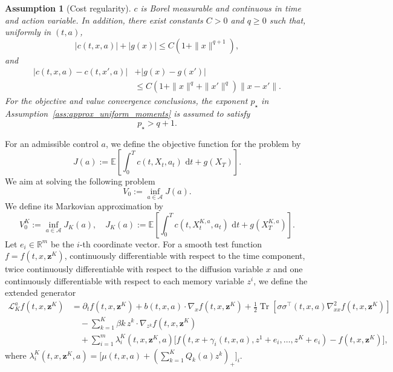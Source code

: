 \documentclass[11pt]{article}
\newtheorem{assumption}{Assumption}[section]
\theoremstyle{remarkitalic}
\theoremstyle{remarkitalic}
\newcommand{\R}{\mathbb R}
\newcommand{\E}{\mathbb E}
\newcommand{\dd}{\,\mathrm d}
\newcommand{\1}{\mathbf 1}
\newcommand{\Tr}{\operatorname{Tr}}
\begin{document}
\begin{assumption}[Cost regularity]
\label{ass:reward}
$c$ is Borel measurable and continuous in time and action variable. In addition, there exist constants $C>0$ and $q\ge0$ such that,  uniformly in
$(t,a)$,
\[
    |c(t,x,a)|+|g(x)|
    \le
    C(1+\|x\|^{q+1}),
\]
and
\[
\begin{aligned}
    |c(t,x,a)-c(t,x',a)|
    &+
    |g(x)-g(x')|  \\
    &\le
    C\left(1+\|x\|^q+\|x'\|^q\right)\|x-x'\|.
\end{aligned}
\] For the objective and value convergence conclusions, the exponent
$p_\star$ in
Assumption~\ref{ass:approx_uniform_moments} is assumed to satisfy
\[
p_\star>q+1.
\]
\end{assumption} For an admissible control $a$, we define the objective function for the problem by
\[
    J(a)
    :=
    \E\left[\int_0^T c(t,X_t,a_t)\,\dd t+g(X_T)\right].
\] We aim at solving the following problem
\[
    V_0:=\inf_{a\in \mathcal A} J(a).
\] We define its Markovian approximation by
\[
    V_0^K:=\inf_{a\in \mathcal A} J_K(a),\quad J_K(a)
    :=
    \E\left[\int_0^T c(t,X_t^{K,a},a_t)\,\dd t+g(X_T^{K,a})\right].
\] Let $e_i\in\R^m$ be the $i$-th coordinate vector. For a smooth test function $f=f(t,x,\mathbf z^K)$, continuously differentiable with respect to the time component, twice continuously differentiable with respect to the diffusion variable $x$ and  one continuously differentiable with respect to each memory variable $z^i$, we define the extended generator 
\begin{align*}
\label{eq:generator}
    \mathcal L_K^a f(t,x,\mathbf z^K)
    &=
    \partial_t f(t,x,\mathbf z^K)
    +
    b(t,x,a)\cdot \nabla_x f(t,x,\mathbf z^K)
    +
    \frac12\Tr\left[\sigma\sigma^\top(t,x,a)\nabla_{xx}^2 f(t,x,\mathbf z^K)\right]
    \nonumber\\
    &\quad
    -
    \sum_{k=1}^K \beta k\, z^k\cdot \nabla_{z^k}f(t,x,\mathbf z^K)
    \nonumber\\
    &\quad
    +
    \sum_{i=1}^m
    \lambda_i^K(t,x,\mathbf z^K,a)
    \Big[
        f(t,x+\gamma_i(t,x,a),z^1+e_i,\dots,z^K+e_i)
        -f(t,x,\mathbf z^K)
    \Big],
\end{align*} where $\lambda_i^K(t,x,\mathbf z^K,a)  =\Big[\mu(t,x,a)
    +
    \left(\sum_{k=1}^K Q_k(a)z^k\right)_+\Big]_i.$
\end{document}
